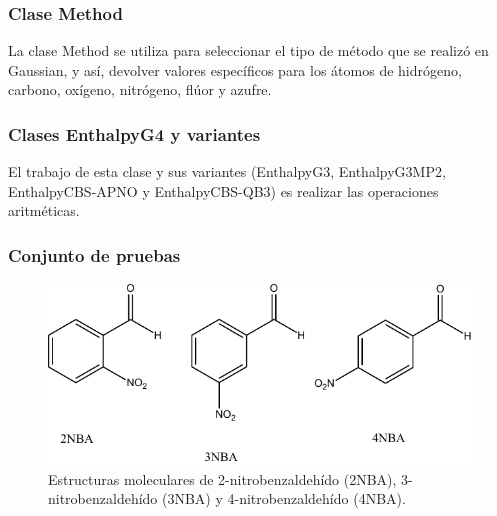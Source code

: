 \documentclass{beamer}
\begin{document}
\begin{frame}
\frametitle{Clase Method}
La clase Method se utiliza para seleccionar el tipo de método que se realizó en Gaussian, y así, devolver valores específicos para los átomos de hidrógeno, carbono, oxígeno, nitrógeno, flúor y azufre.
\end{frame}
\begin{frame}
\frametitle{Clases EnthalpyG4 y variantes}
El trabajo de esta clase y sus variantes (EnthalpyG3, EnthalpyG3MP2, EnthalpyCBS-APNO y EnthalpyCBS-QB3) es realizar las operaciones aritméticas.
\end{frame}

\begin{frame}
\frametitle{Conjunto de pruebas}


\begin{figure}[hbtp]
\begin{center}
\includegraphics[width=\textwidth]{images/n-NBA.pdf}
\caption{Estructuras moleculares de 2-nitrobenzaldeh\'{i}do (2NBA), 3-nitrobenzaldeh\'{i}do (3NBA) y 4-nitrobenzaldeh\'{i}do (4NBA).}
\label{n-NBA}
\end{center}
\end{figure}

\end{frame}

\end{document}

